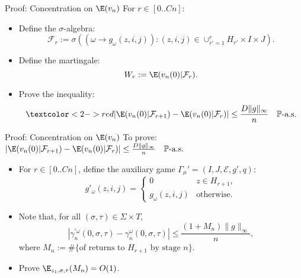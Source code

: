 \begin{frame}{Proof: Concentration on $\E(v_n)$}
  For $r \in [0..Cn]$:
  \vspace{0.2cm}

  \begin{itemize}
    \item Define the $\sigma$-algebra:
    \[
      \mathcal{F}_r := \sigma((\omega \to g_{\omega}(z, i, j)): (z, i, j) \in \cup_{r' = 1}^{r}H_{r'}\times I \times J).
    \]
    \item Define the martingale:
      $$
        W_r := \E(v_n(0)|\mathcal{F}_r).
      $$
    \item Prove the inequality:
    \begin{equation*}
      \textcolor<2->{red}{|\E (v_n(0)|\mathcal{F}_{r+1}) - \E (v_n(0)|\mathcal{F}_r)| \leq \frac{D\|g\|_{\infty}}{n} \quad \mathbb{P}\text{-a.s.}}
    \end{equation*}
  \end{itemize}
\end{frame}
\begin{frame}{Proof: Concentration on $\E(v_n)$}
  To prove: $|\E (v_n(0)|\mathcal{F}_{r+1}) - \E (v_n(0)|\mathcal{F}_r)| \leq \frac{D\|g\|_{\infty}}{n} \quad \mathbb{P}\text{-a.s.}$
  \vspace{0.5cm}

  
  \vspace{0.2cm}
  \begin{itemize}
    \item For $r \in [0..Cn]$, define the auxiliary game $\Gamma_{\mu}' = (I, J, \mathcal{E}, g', q)$:
    \[
      g'_{\omega}(z, i, j) = \begin{cases}
                                0          &   z \in H_{r+1},\\
                                g_{\omega}(z, i, j) & \text{otherwise} .
                              \end{cases}
    \]
    \item Note that, for all $(\sigma, \tau) \in \Sigma \times T$,
    \[
      |\gamma_n^{'\omega}(0, \sigma, \tau) - \gamma_n^{\omega}(0, \sigma, \tau)| \leq \frac{(1+M_n)\|g\|_{\infty}}{n},
    \]
    where $M_n := \#\{\text{of returns to } H_{r+1} \text{ by stage } n\}$.
    \item Prove $\E_{z_1, \sigma, \tau}(M_n) = O(1)$.
  \end{itemize}
\end{frame}

